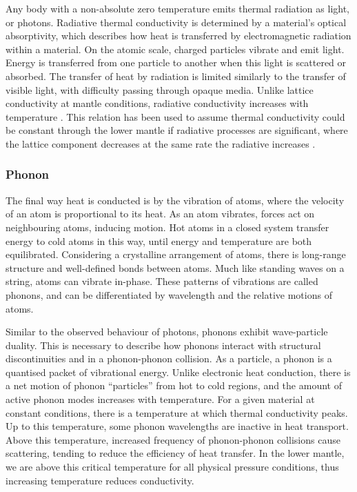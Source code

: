 Any body with a non-absolute zero temperature emits thermal radiation as light, or photons. Radiative thermal conductivity is determined by a material's optical absorptivity, which describes how heat is transferred by electromagnetic radiation within a material. On the atomic scale, charged particles vibrate and emit light. Energy is transferred from one particle to another when this light is scattered or absorbed. The transfer of heat by radiation is limited similarly to the transfer of visible light, with difficulty passing through opaque media. Unlike lattice conductivity at mantle conditions, radiative conductivity increases with temperature \citep{Hofmeister1999}. This relation has been used to assume thermal conductivity could be constant through the lower mantle if radiative processes are significant, where the lattice component decreases at the same rate the radiative increases \citep{Tang2014}.

\subsubsection{Phonon}

The final way heat is conducted is by the vibration of atoms, where the velocity of an atom is proportional to its heat. As an atom vibrates, forces act on neighbouring atoms, inducing motion. Hot atoms in a closed system transfer energy to cold atoms in this way, until energy and temperature are both equilibrated. Considering a crystalline arrangement of atoms, there is long-range structure and well-defined bonds between atoms. Much like standing waves on a string, atoms can vibrate in-phase. These patterns of vibrations are called phonons, and can be differentiated by wavelength and the relative motions of atoms.

Similar to the observed behaviour of photons, phonons exhibit wave-particle duality. This is necessary to describe how phonons interact with structural discontinuities and in a phonon-phonon collision. As a particle, a phonon is a quantised packet of vibrational energy. Unlike electronic heat conduction, there is a net motion of phonon ``particles'' from hot to cold regions, and the amount of active phonon modes increases with temperature. For a given material at constant conditions, there is a temperature at which thermal conductivity peaks. Up to this temperature, some phonon wavelengths are inactive in heat transport. Above this temperature, increased frequency of phonon-phonon collisions cause scattering, tending to reduce the efficiency of heat transfer. In the lower mantle, we are above this critical temperature for all physical pressure conditions, thus increasing temperature reduces conductivity.





